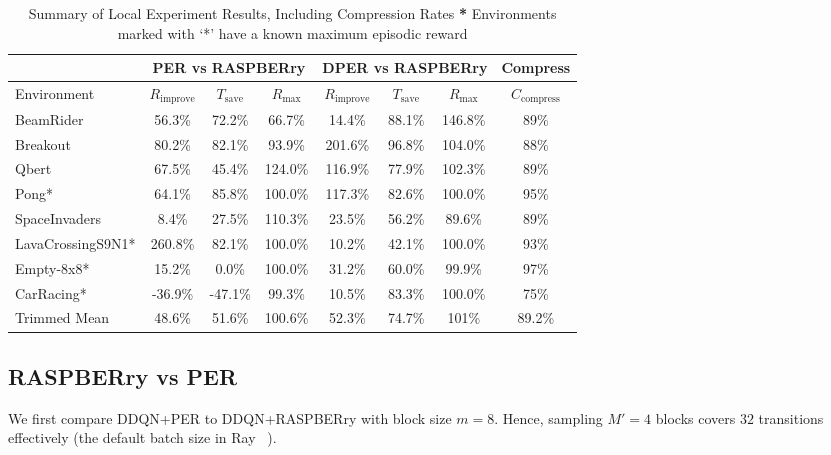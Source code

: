 \documentclass[10pt]{article} %
\begin{document}
\begin{table}[t]
\centering\small
\begin{tabular}{lccccccc}
\toprule
 & \multicolumn{3}{c}{PER vs RASPBERry} & \multicolumn{3}{c}{DPER vs RASPBERry} & Compress  \\
\midrule
Environment & $R_{\text{improve}}$ & $T_{\text{save}}$ & $R_{\text{max}}$ & $R_{\text{improve}}$ & $T_{\text{save}}$ & $R_{\text{max}}$ & $C_{\text{compress}}$\\
\midrule
BeamRider        & 56.3\%  & 72.2\%  & 66.7\%  & 14.4\%  & 88.1\%  & 146.8\%  &  89\% \\
Breakout        & 80.2\% & 82.1\% & 93.9\% & 201.6\% & 96.8\% & 104.0\% &  88\% \\
Qbert            & 67.5\%  & 45.4\%  & 124.0\% & 116.9\% & 77.9\%  & 102.3\%  &  89\% \\
Pong*             & 64.1\%  & 85.8\%  & 100.0\% & 117.3\% & 82.6\%  & 100.0\%  &  95\% \\
SpaceInvaders    & 8.4\%   & 27.5\%  & 110.3\% & 23.5\%  & 56.2\%  & 89.6\%   &  89\% \\
LavaCrossingS9N1* & 260.8\% & 82.1\%  & 100.0\% & 10.2\%  & 42.1\%  & 100.0\%  &  93\% \\
Empty-8x8*       & 15.2\%  & 0.0\%   & 100.0\% & 31.2\%  & 60.0\%  & 99.9\%   &  97\% \\
CarRacing*        & -36.9\% & -47.1\% & 99.3\%  & 10.5\%  & 83.3\%  & 100.0\%  &  75\% \\
\midrule
Trimmed Mean     & 48.6\%  & 51.6\%  & 100.6\% & 52.3\%  & 74.7\%  & 101\%  &  89.2\% \\
\bottomrule
\end{tabular}
\caption{Summary of Local Experiment Results, Including Compression Rates
\newline \textbf{*} Environments marked with `*' have a known maximum episodic reward}
\label{tab:local_game_summary}
\end{table}

\subsection{RASPBERry vs PER} \label{sec:diff_per_pber}
We first compare DDQN+PER to DDQN+RASPBERry with block size $m=8$.
Hence, sampling $M'=4$ blocks covers $32$ transitions effectively (the default batch size in Ray ~\citep{RayprojectRlexperiments_ray_2022}).  
\end{document}
